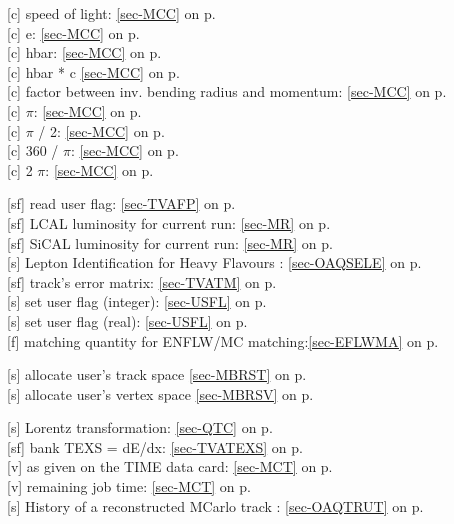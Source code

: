  [c] speed of light: \ref{sec-MCC} on p.~\pageref{sec-MCC}\\
 [c] e: \ref{sec-MCC} on p.~\pageref{sec-MCC}\\
 [c] hbar: \ref{sec-MCC} on p.~\pageref{sec-MCC}\\
 [c] hbar * c \ref{sec-MCC} on p.~\pageref{sec-MCC}\\
 [c] factor between inv. bending radius and momentum:
 \ref{sec-MCC} on p.~\pageref{sec-MCC}\\
 [c] $\pi$: \ref{sec-MCC} on p.~\pageref{sec-MCC}\\
 [c] $\pi$ / 2: \ref{sec-MCC} on p.~\pageref{sec-MCC}\\
 [c] 360 / $\pi$: \ref{sec-MCC} on p.~\pageref{sec-MCC}\\
 [c] 2 $\pi$: \ref{sec-MCC} on p.~\pageref{sec-MCC}
 
 [sf] read user flag: \ref{sec-TVAFP} on p.~\pageref{sec-TVAFP}\\
 [sf] LCAL  luminosity for current run: \ref{sec-MR} on p.~\pageref{sec-MR}\\
 [sf] SiCAL luminosity for current run: \ref{sec-MR} on p.~\pageref{sec-MR}\\
 [s] Lepton Identification for Heavy Flavours : \ref{sec-OAQSELE} on p.~\pageref{sec-OAQSELE}\\
 [sf] track's error matrix: \ref{sec-TVATM} on p.~\pageref{sec-TVATM}\\
 [s] set user flag (integer): \ref{sec-USFL} on p.~\pageref{sec-USFL}\\
 [s] set user flag (real): \ref{sec-USFL} on p.~\pageref{sec-USFL}\\
 [f] matching quantity for ENFLW/MC matching:\ref{sec-EFLWMA} on p.~\pageref{sec-EFLWMA}
 
 [s] allocate user's track space \ref{sec-MBRST} on p.~\pageref{sec-MBRST}\\
 [s] allocate user's vertex space \ref{sec-MBRSV} on p.~\pageref{sec-MBRSV}
 
 [s] Lorentz transformation: \ref{sec-QTC} on p.~\pageref{sec-QTC}\\
 [sf] bank TEXS = dE/dx: \ref{sec-TVATEXS} on p.~\pageref{sec-TVATEXS}\\
 [v] as given on the TIME data card: \ref{sec-MCT} on p.~\pageref{sec-MCT}\\
 [v] remaining job time: \ref{sec-MCT} on p.~\pageref{sec-MCT}\\
 [s] History of a reconstructed MCarlo track : \ref{sec-OAQTRUT} on p.~\pageref{sec-OAQTRUT}
 
